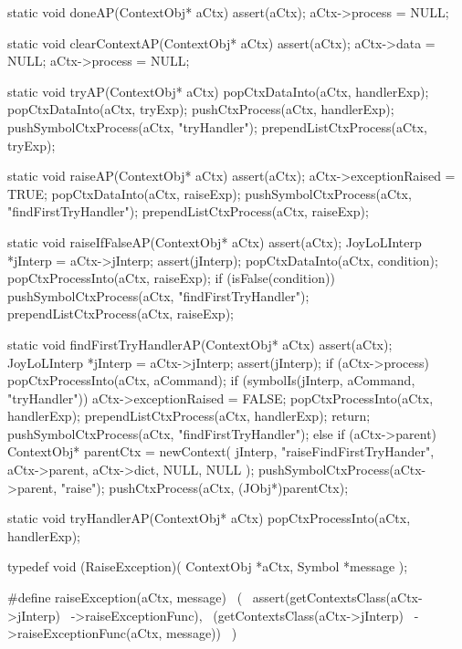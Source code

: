 \startCCode
static void doneAP(ContextObj* aCtx) {
  assert(aCtx);
  aCtx->process = NULL;
}
\stopCCode

\startCCode
static void clearContextAP(ContextObj* aCtx) {
  assert(aCtx);
  aCtx->data    = NULL;
  aCtx->process = NULL;
}
\stopCCode

\startCCode
static void tryAP(ContextObj* aCtx) {
  popCtxDataInto(aCtx, handlerExp);
  popCtxDataInto(aCtx, tryExp);
  pushCtxProcess(aCtx, handlerExp);
  pushSymbolCtxProcess(aCtx, "tryHandler");
  prependListCtxProcess(aCtx, tryExp);
}
\stopCCode

\startCCode
static void raiseAP(ContextObj* aCtx) {
  assert(aCtx);
  aCtx->exceptionRaised = TRUE;
  popCtxDataInto(aCtx, raiseExp);
  pushSymbolCtxProcess(aCtx, "findFirstTryHandler");
  prependListCtxProcess(aCtx, raiseExp);
}
\stopCCode

\startCCode
static void raiseIfFalseAP(ContextObj* aCtx) {
  assert(aCtx);
  JoyLoLInterp *jInterp = aCtx->jInterp;
  assert(jInterp);
  popCtxDataInto(aCtx, condition);
  popCtxProcessInto(aCtx, raiseExp);
  if (isFalse(condition)) {
    pushSymbolCtxProcess(aCtx, "findFirstTryHandler");
    prependListCtxProcess(aCtx, raiseExp);
  }
}
\stopCCode

\startCCode
static void findFirstTryHandlerAP(ContextObj* aCtx) {
  assert(aCtx);
  JoyLoLInterp *jInterp = aCtx->jInterp;
  assert(jInterp);
  if (aCtx->process) {
    popCtxProcessInto(aCtx, aCommand);
    if (symbolIs(jInterp, aCommand, "tryHandler")) {
      aCtx->exceptionRaised = FALSE;
      popCtxProcessInto(aCtx, handlerExp);
      prependListCtxProcess(aCtx, handlerExp);
      return;
    }
    pushSymbolCtxProcess(aCtx, "findFirstTryHandler");
  } else {
    if (aCtx->parent) {
      ContextObj* parentCtx = newContext(
        jInterp,
        "raiseFindFirstTryHander",
        aCtx->parent,
        aCtx->dict,
        NULL,
        NULL
      );
      pushSymbolCtxProcess(aCtx->parent, "raise");
      pushCtxProcess(aCtx, (JObj*)parentCtx);
    }
  }
}
\stopCCode

\startCCode
static void tryHandlerAP(ContextObj* aCtx) {
  popCtxProcessInto(aCtx, handlerExp);
}
\stopCCode

\startCHeader
typedef void (RaiseException)(
  ContextObj *aCtx,
  Symbol     *message
);

#define raiseException(aCtx, message)       \
  (                                         \
    assert(getContextsClass(aCtx->jInterp)  \
      ->raiseExceptionFunc),                \
    (getContextsClass(aCtx->jInterp)        \
      ->raiseExceptionFunc(aCtx, message))  \
  )
\stopCHeader

